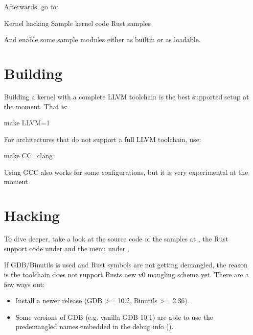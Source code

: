 \documentclass[a4paper,11pt,english]{sphinxmanual}
\begin{document}
Afterwards, go to:

\begin{sphinxVerbatim}[commandchars=\\\{\}]
Kernel hacking
    \PYGZhy{}\PYGZgt{} Sample kernel code
        \PYGZhy{}\PYGZgt{} Rust samples
\end{sphinxVerbatim}

And enable some sample modules either as built\sphinxhyphen{}in or as loadable.


\section{Building}
\label{\detokenize{quick-start:building}}
Building a kernel with a complete LLVM toolchain is the best supported setup
at the moment. That is:

\begin{sphinxVerbatim}[commandchars=\\\{\}]
make LLVM=1
\end{sphinxVerbatim}

For architectures that do not support a full LLVM toolchain, use:

\begin{sphinxVerbatim}[commandchars=\\\{\}]
make CC=clang
\end{sphinxVerbatim}

Using GCC also works for some configurations, but it is very experimental at
the moment.


\section{Hacking}
\label{\detokenize{quick-start:hacking}}
To dive deeper, take a look at the source code of the samples
at , the Rust support code under  and
the  menu under .

If GDB/Binutils is used and Rust symbols are not getting demangled, the reason
is the toolchain does not support Rust\textquotesingle{}s new v0 mangling scheme yet.
There are a few ways out:
\begin{itemize}
\item {} 
Install a newer release (GDB \textgreater{}= 10.2, Binutils \textgreater{}= 2.36).

\item {} 
Some versions of GDB (e.g. vanilla GDB 10.1) are able to use
the pre\sphinxhyphen{}demangled names embedded in the debug info ().

\end{itemize}
\end{document}
